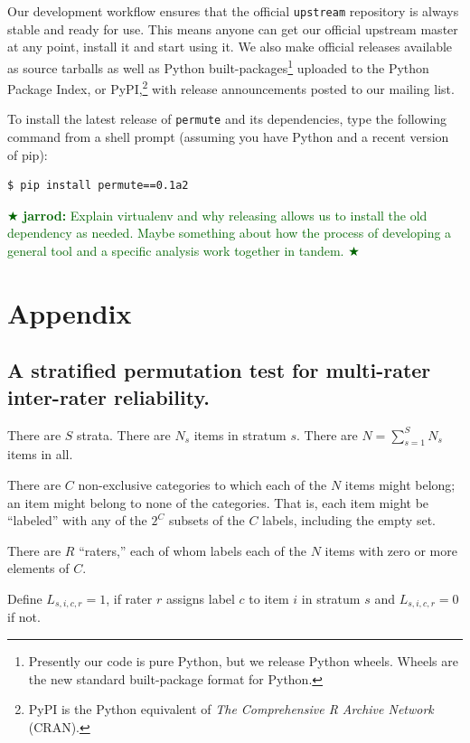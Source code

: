 \documentclass[]{article}
\newcommand{\jarrod}[1] { \textcolor{darkgreen} {
\ensuremath{\bigstar} {\bf jarrod:}  {#1}
\ensuremath{\bigstar} } }
\begin{document}
Our development workflow ensures that the official \texttt{upstream} repository
is always stable and ready for use.
This means anyone can get our official upstream master at any point, install it
and start using it.
We also make official releases available as source tarballs as well as Python
built-packages\footnote{Presently our code is pure Python, but we release
Python wheels.
Wheels are the new standard built-package format for Python.} uploaded to the
Python Package Index, or PyPI,\footnote{PyPI is the Python equivalent of \emph{The
Comprehensive R Archive Network} (CRAN).} with release announcements posted to
our mailing list.

To install the latest release of \texttt{permute} and its dependencies, type
the following command from a shell prompt (assuming you have Python and a
recent version of pip):
\begin{verbatim}
$ pip install permute==0.1a2
\end{verbatim}
\jarrod{Explain virtualenv and why releasing allows us to install the
old dependency as needed.
Maybe something about how the process of developing a general tool and a
specific analysis work together in tandem.}




\pagebreak

\section*{Appendix}

\subsection*{A stratified permutation test for multi-rater inter-rater reliability.}

There are $S$ strata.
There are $N_s$ items in stratum $s$.
There are $N = \sum_{s=1}^S N_s$ items in all.

There are $C$ non-exclusive categories to which each of the $N$ items might
belong; an item might belong to none of the categories.
That is, each item might be ``labeled'' with any of the $2^C$ subsets
of the $C$ labels, including the empty set.

There are $R$ ``raters,'' each of whom labels each of the $N$ items with zero
or more elements of $C$.

Define $L_{s,i,c,r} = 1$, if rater $r$ assigns label $c$ to item $i$ in stratum
$s$ and $L_{s,i,c,r} = 0$ if not.
\end{document}
